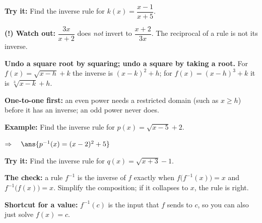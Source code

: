 \documentclass[12pt]{article}
\begin{document}
\begin{tryitbox}
\textbf{Try it:} \quad Find the inverse rule for $k(x) = \dfrac{x - 1}{x + 5}$.\\[2pt]
\end{tryitbox}

\begin{watchoutbox}
\textbf{(!) Watch out:} $\dfrac{3x}{x+2}$ does \emph{not} invert to $\dfrac{x+2}{3x}$. The reciprocal of a rule is not its inverse.
\end{watchoutbox}


\begin{formulabox}
\textbf{Undo a square root by squaring; undo a square by taking a root.} For $f(x) = \sqrt{x - h} + k$ the inverse is $(x - k)^2 + h$; for $f(x) = (x - h)^3 + k$ it is $\sqrt[3]{x - k} + h$.\par
\textbf{One-to-one first:} an even power needs a restricted domain (such as $x \ge h$) before it has an inverse; an odd power never does.
\end{formulabox}

\begin{examplebox}
\textbf{Example:} \quad Find the inverse rule for $p(x) = \sqrt{x - 5} + 2$.

$\Rightarrow\quad \ans{p^{-1}(x) = (x - 2)^2 + 5}$
\end{examplebox}

\begin{tryitbox}
\textbf{Try it:} \quad Find the inverse rule for $q(x) = \sqrt{x + 3} - 1$.\\[2pt]
\end{tryitbox}


\begin{formulabox}
\textbf{The check:} a rule $f^{-1}$ is the inverse of $f$ exactly when $f\bigl(f^{-1}(x)\bigr) = x$ and $f^{-1}\bigl(f(x)\bigr) = x$. Simplify the composition; if it collapses to $x$, the rule is right.\par
\textbf{Shortcut for a value:} $f^{-1}(c)$ is the input that $f$ sends to $c$, so you can also just solve $f(x) = c$.
\end{formulabox}
\end{document}
